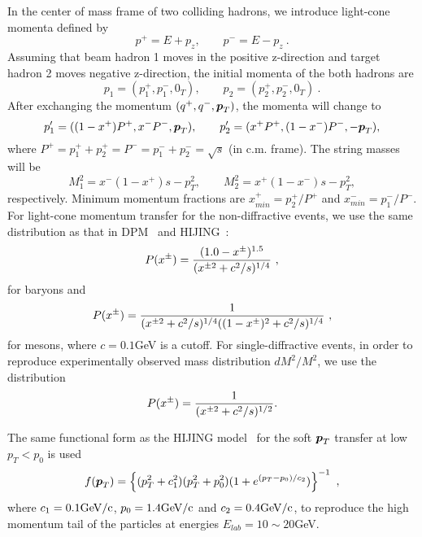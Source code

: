 \documentclass[]{article}
\newcommand{\bold}[1]{\mbox{\boldmath $#1$}}    %
\newcommand{\pp}{{\bold{p}}}
\newcommand{\srt}{\mbox{$\sqrt{s}$}}
\def\GeVc{{\rm GeV/c}}
\begin{document}
In the center of mass frame of two colliding hadrons,
we introduce light-cone momenta defined by
\begin{equation}
p^+ = E+p_z, \qquad p^- = E-p_z\ .
\end{equation}
Assuming that beam hadron 1 moves in the positive z-direction
and target hadron 2 moves negative z-direction,
the initial momenta of the both hadrons are
\begin{equation}
  p_1 = (p_1^+,p_1^-,0_T), \qquad p_2 = (p_2^+,p_2^-,0_T)\ . 
\end{equation}
After exchanging the momentum $(q^+,q^-,\pp_T)$, the momenta will change to
\begin{equation}
       p'_1 = ((1-x^+)P^+,x^-P^-,\pp_T),
 \qquad p'_2 = (x^+P^+,(1-x^-)P^-,-\pp_T), 
\end{equation}
where $P^+=p_1^++p_2^+=P^-=p_1^-+p_2^-=\srt$ (in c.m. frame).
The string masses will be
\begin{equation}
  M_1^2= x^-(1-x^+)s-p^2_T, \qquad M_2^2=x^+(1-x^-)s-p^2_T,
\end{equation}
respectively.
Minimum momentum fractions are
 $x_{min}^+=p_2^+/P^+$ and $x_{min}^-=p_1^-/P^-$.
For light-cone momentum transfer for the non-diffractive events,
 we use the same distribution as that in
DPM~\cite{dpm} and HIJING~\cite{hijing}:
\begin{equation}
  P(x^{\pm})= {(1.0-x^{\pm})^{1.5}\over (x^{\pm2}+c^2/s)^{1/4}}\ ,
\end{equation}
for baryons and
\begin{equation}
  P(x^{\pm})= {1\over (x^{\pm2}+c^2/s)^{1/4}((1-x^{\pm})^2+c^2/s)^{1/4}}\ ,
\end{equation}
for mesons, where $c=0.1 $GeV is a cutoff.
For single-diffractive events, in order to reproduce
experimentally observed mass distribution $dM^2/M^2$,
we use the distribution
\begin{equation}
   P(x^{\pm})={1 \over (x^{\pm2}+c^2/s)^{1/2}}.
\end{equation}


The same functional form as the HIJING model~\cite{hijing}
  for the soft $\pp_T$ transfer at low 
$p_T<p_0$
is used
\begin{equation}
   f(\pp_T) = \left\{ (p_T^2+c_1^2)(p_T^2+p_0^2)
                     (1+e^{(p_T-p_0)/c_2})  \right\}^{-1} ~,
\end{equation}
where $c_1=0.1\GeVc$, $p_0=1.4\GeVc$ and $c_2=0.4\GeVc$,
to reproduce the high momentum tail of the particles
at energies $E_{lab}=10\sim20$GeV.
\end{document}
